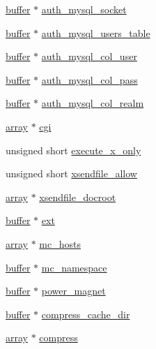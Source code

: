 \begin{DoxyCompactItemize}
\hyperlink{structbuffer}{buffer} $\ast$ \hyperlink{structplugin__config_a2ee3749c848991c3017517288d5db439}{auth\-\_\-mysql\-\_\-socket}
\item 
\hyperlink{structbuffer}{buffer} $\ast$ \hyperlink{structplugin__config_a6f1ae54516b011db08bcb2df295840e5}{auth\-\_\-mysql\-\_\-users\-\_\-table}
\item 
\hyperlink{structbuffer}{buffer} $\ast$ \hyperlink{structplugin__config_ad997efd0762d17ccc7bae246d9209e22}{auth\-\_\-mysql\-\_\-col\-\_\-user}
\item 
\hyperlink{structbuffer}{buffer} $\ast$ \hyperlink{structplugin__config_a2e57c4744fb37470af2d8ba22a6378e7}{auth\-\_\-mysql\-\_\-col\-\_\-pass}
\item 
\hyperlink{structbuffer}{buffer} $\ast$ \hyperlink{structplugin__config_ae77df3db136f7af6dbf5b9efe5760a04}{auth\-\_\-mysql\-\_\-col\-\_\-realm}
\item 
\hyperlink{structarray}{array} $\ast$ \hyperlink{structplugin__config_a1e820d2000c648348113f8eab880541e}{cgi}
\item 
unsigned short \hyperlink{structplugin__config_ade3cfcb6c674c770a6e7c5c352476383}{execute\-\_\-x\-\_\-only}
\item 
unsigned short \hyperlink{structplugin__config_a5bbbfcc87c33eefe362863674f108d79}{xsendfile\-\_\-allow}
\item 
\hyperlink{structarray}{array} $\ast$ \hyperlink{structplugin__config_ab04d89b85e2ebf153d90248808df4640}{xsendfile\-\_\-docroot}
\item 
\hyperlink{structbuffer}{buffer} $\ast$ \hyperlink{structplugin__config_af4c96ae345ae4050dced2f94cb53d377}{ext}
\item 
\hyperlink{structarray}{array} $\ast$ \hyperlink{structplugin__config_a66fcd0008e865cbc0fd098c805db8082}{mc\-\_\-hosts}
\item 
\hyperlink{structbuffer}{buffer} $\ast$ \hyperlink{structplugin__config_ab49f89fd918e1d87b4b6ca39efc92ec0}{mc\-\_\-namespace}
\item 
\hyperlink{structbuffer}{buffer} $\ast$ \hyperlink{structplugin__config_a592499e81ed0ec95452ac7d5bf8f3bd0}{power\-\_\-magnet}
\item 
\hyperlink{structbuffer}{buffer} $\ast$ \hyperlink{structplugin__config_a0b46108e6b03529131edf5267fb2901e}{compress\-\_\-cache\-\_\-dir}
\item 
\hyperlink{structarray}{array} $\ast$ \hyperlink{structplugin__config_a7932fcac5458d93837e7e6e3afffa6a4}{compress}
\item 

\end{DoxyCompactItemize}
